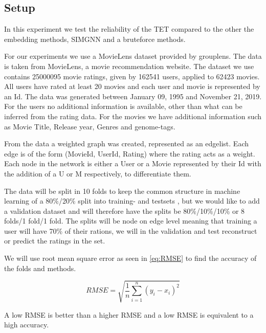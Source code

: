 \subsection{Setup}
In this experiment we test the reliability of the TET compared to the other the embedding methods, SIMGNN and a bruteforce methods. 

For our experiments we use a MovieLens dataset provided by grouplens\cite{Grouplensdata}. The data is taken from MovieLens, a movie recommendation website. The dataset we use contains 25000095 movie ratings, given by 162541 users, applied to 62423 movies. All users have rated at least 20 movies and each user and movie is represented by an Id. The data was generated between January 09, 1995 and November 21, 2019. For the users no additional information is available, other than what can be inferred from the rating data. For the movies we have additional information such as Movie Title, Release year, Genres and genome-tags.

From the data a weighted graph was created, represented as an edgelist. Each edge is of the form (MovieId, UserId, Rating) where the rating acts as a weight. Each node in the network is either a User or a Movie represented by their Id with the addition of a U or M respectively, to differentiate them.

The data will be split in 10 folds to keep the common structure in machine learning of a 80\%/20\% split into training- and testsets \cite{Ricci2015}, but we would like to add a validation dataset and will therefore have the splits be 80\%/10\%/10\% or 8 folds/1 fold/1 fold. The splits will be node on edge level meaning that training a user will have 70\% of their rations, we will in the validation and test reconstruct or predict the ratings in the set.

We will use root mean square error as seen in \autoref{eq:RMSE}\cite{chai2014root} to find the accuracy of the folds and methods.

\begin{equation}\label{eq:RMSE}
RMSE = \sqrt{\frac{1}{n}\sum^n_{i=1}(y_i - x_i)^2}
\end{equation}

A low RMSE is better than a higher RMSE and a low RMSE is equivalent to a high accuracy.

